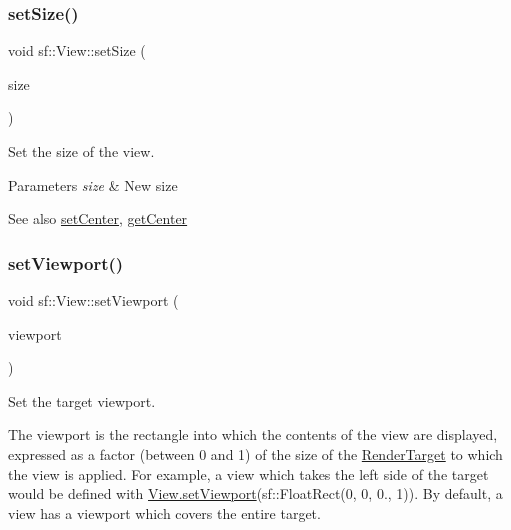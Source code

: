 \subsubsection{\texorpdfstring{setSize()}{setSize()}\hspace{0.1cm}{\footnotesize\ttfamily [2/2]}}
{\footnotesize\ttfamily void sf\+::\+View\+::set\+Size (\begin{DoxyParamCaption}\item[{const \mbox{\hyperlink{classsf_1_1_vector2}{Vector2f}} \&}]{size }\end{DoxyParamCaption})}



Set the size of the view. 


\begin{DoxyParams}{Parameters}
{\em size} & New size\\
\hline
\end{DoxyParams}
\begin{DoxySeeAlso}{See also}
\mbox{\hyperlink{classsf_1_1_view_aa8e3fedb008306ff9811163545fb75f2}{set\+Center}}, \mbox{\hyperlink{classsf_1_1_view_a7f4443c194c691ae4dcf8fd9dd0eaa46}{get\+Center}} \begin{DoxyVerb}\end{DoxyVerb}
 
\end{DoxySeeAlso}
\mbox{\label{classsf_1_1_view_a8eaec46b7d332fe834f016d0187d4b4a}} 
\subsubsection{\texorpdfstring{setViewport()}{setViewport()}}
{\footnotesize\ttfamily void sf\+::\+View\+::set\+Viewport (\begin{DoxyParamCaption}\item[{const \mbox{\hyperlink{classsf_1_1_rect}{Float\+Rect}} \&}]{viewport }\end{DoxyParamCaption})}



Set the target viewport. 

The viewport is the rectangle into which the contents of the view are displayed, expressed as a factor (between 0 and 1) of the size of the \mbox{\hyperlink{classsf_1_1_render_target}{Render\+Target}} to which the view is applied. For example, a view which takes the left side of the target would be defined with \mbox{\hyperlink{classsf_1_1_view_a8eaec46b7d332fe834f016d0187d4b4a}{View.\+set\+Viewport}}(sf\+::\+Float\+Rect(0, 0, 0., 1)). By default, a view has a viewport which covers the entire target.


